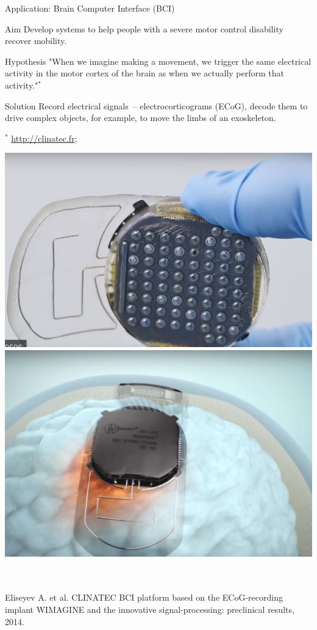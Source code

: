 \documentclass[9pt]{beamer}
\begin{document}
\begin{frame}{Application: Brain Computer Interface (BCI)}
	\begin{minipage}{0.58\linewidth}
		\begin{block}{Aim}
		Develop systems to help people with a severe motor control disability recover mobility.
		\end{block}
	\begin{block}{Hypothesis}
	"When we imagine making a movement, we trigger the same electrical activity in the motor cortex of the brain as when we actually perform that activity."$^*$
	\end{block}
	\begin{block}{Solution}
	Record electrical signals~-- electrocorticograms (ECoG), decode them to drive complex objects, for example, to move the limbs of an exoskeleton. 
	\end{block}
	$^*$ \url{http://clinatec.fr};
	\end{minipage}%
\begin{minipage}{0.4\linewidth}
	\centering
	\includegraphics[width=0.9\linewidth]{figs/deviceClinatec} \\
	\vspace{0.5cm}
	\includegraphics[width=0.9\linewidth]{figs/brainClinatec}
\end{minipage}
\vspace{0.3cm} \\
\hrulefill \\
\small{Eliseyev A. et al. CLINATEC BCI platform based on the ECoG-recording implant WIMAGINE and the innovative signal-processing: preclinical results, 2014.}
\end{frame}
\end{document}
